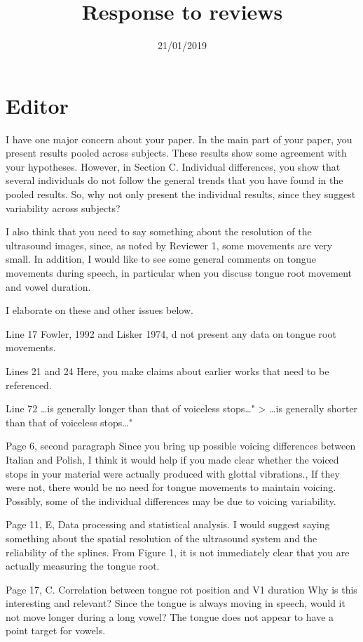 \documentclass[]{article}
\title{Response to reviews}
\author{}
\date{21/01/2019}
\begin{document}
\maketitle

\hypertarget{editor}{%
\section{Editor}\label{editor}}

I have one major concern about your paper. In the main part of your
paper, you present results pooled across subjects. These results show
some agreement with your hypotheses. However, in Section C. Individual
differences, you show that several individuals do not follow the general
trends that you have found in the pooled results. So, why not only
present the individual results, since they suggest variability across
subjects?

I also think that you need to say something about the resolution of the
ultrasound images, since, as noted by Reviewer 1, some movements are
very small. In addition, I would like to see some general comments on
tongue movements during speech, in particular when you discuss tongue
root movement and vowel duration.

I elaborate on these and other issues below.

Line 17 Fowler, 1992 and Lisker 1974, d not present any data on tongue
root movements.

Lines 21 and 24 Here, you make claims about earlier works that need to
be referenced.

Line 72 \ldots{}is generally longer than that of voiceless
stops\ldots{}" \textgreater{} \ldots{}is generally shorter than that of
voiceless stops\ldots{}"

Page 6, second paragraph Since you bring up possible voicing differences
between Italian and Polish, I think it would help if you made clear
whether the voiced stops in your material were actually produced with
glottal vibrations., If they were not, there would be no need for tongue
movements to maintain voicing. Possibly, some of the individual
differences may be due to voicing variability.

Page 11, E, Data processing and statistical analysis. I would suggest
saying something about the spatial resolution of the ultrasound system
and the reliability of the splines. From Figure 1, it is not immediately
clear that you are actually measuring the tongue root.

Page 17, C. Correlation between tongue rot position and V1 duration Why
is this interesting and relevant? Since the tongue is always moving in
speech, would it not move longer during a long vowel? The tongue does
not appear to have a point target for vowels.
\end{document}
